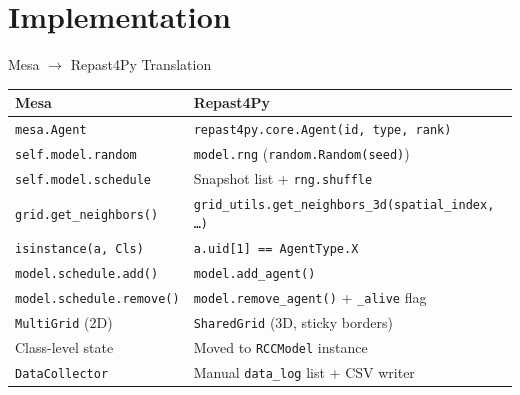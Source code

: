 \documentclass[aspectratio=169,10pt]{beamer}
\begin{document}
\section{Implementation}

\begin{frame}{Mesa $\to$ Repast4Py Translation}
  \centering
  \small
  \begin{tabular}{@{}p{4.8cm} p{6.5cm}@{}}
    \toprule
    \textbf{Mesa} & \textbf{Repast4Py} \\
    \midrule
    \texttt{mesa.Agent} & \texttt{repast4py.core.Agent(id, type, rank)} \\
    \texttt{self.model.random} & \texttt{model.rng} (\texttt{random.Random(seed)}) \\
    \texttt{self.model.schedule} & Snapshot list + \texttt{rng.shuffle} \\
    \texttt{grid.get\_neighbors()} & \texttt{grid\_utils.get\_neighbors\_3d(spatial\_index, \ldots)} \\
    \texttt{isinstance(a, Cls)} & \texttt{a.uid[1] == AgentType.X} \\
    \texttt{model.schedule.add()} & \texttt{model.add\_agent()} \\
    \texttt{model.schedule.remove()} & \texttt{model.remove\_agent()} + \texttt{\_alive} flag \\
    \texttt{MultiGrid} (2D) & \texttt{SharedGrid} (3D, sticky borders) \\
    Class-level state & Moved to \texttt{RCCModel} instance \\
    \texttt{DataCollector} & Manual \texttt{data\_log} list + CSV writer \\
    \bottomrule
  \end{tabular}
\end{frame}
\end{document}

